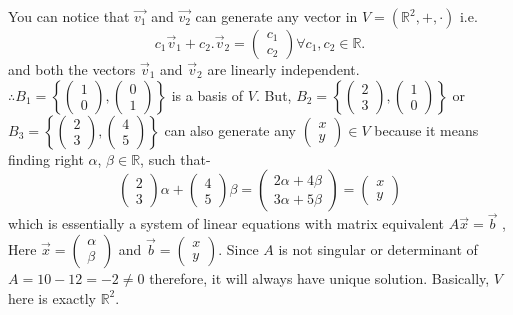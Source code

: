 \documentclass{article}
\begin{document}
\begin{itemize}
You can notice that $\Vec{v_1}$ and $\Vec{v_2}$ can generate any vector in $V=(\mathbb{R}^2,+,\cdot)$ i.e. \[c_1\Vec{v}_1+c_2.\Vec{v}_2=
\begin{pmatrix} c_1\\c_2\end{pmatrix} \forall c_1, c_2 \in \mathbb{R}.\] 
and both the vectors $\vec{v}_1$ and $\vec{v}_2$ are linearly independent.
\(\therefore B_1 = \left\{
\begin{pmatrix}
1\\0
\end{pmatrix}
,
\begin{pmatrix}
0\\1
\end{pmatrix}
\right\} \) is a basis of $V$. But, 
\(B_2 = \left\{
\begin{pmatrix}
2\\3
\end{pmatrix},
\begin{pmatrix}
1\\0
\end{pmatrix}
\right\}\)
or 
\(B_3 = \left\{
\begin{pmatrix}
2\\3
\end{pmatrix},
\begin{pmatrix}
4\\5
\end{pmatrix}\right\}\) can also generate any \(\begin{pmatrix}
x\\y
\end{pmatrix} \in V\) because it means finding right $\alpha$, $\beta \in \mathbb{R}$, such that- \\
\[\begin{pmatrix}
2\\3
\end{pmatrix}\alpha
+ \begin{pmatrix}
4\\5
\end{pmatrix}\beta = 
\begin{pmatrix}
2\alpha + 4\beta\\
3\alpha + 5\beta    
\end{pmatrix}
=
\begin{pmatrix}
x\\y
\end{pmatrix}\]
which is essentially a system of linear equations with matrix equivalent $A\Vec{x} = \Vec{b}$ , Here $\Vec{x}=\begin{pmatrix}
\alpha\\\beta
\end{pmatrix}$ and $\Vec{b}=\begin{pmatrix}
x\\y
\end{pmatrix}$. 
Since $A$ is not singular or determinant of $A =10-12=-2\ne0$ therefore, it will always have unique solution. Basically, $V$ here is exactly $\mathbb{R}^2$.\\


\end{itemize}
\end{document}
